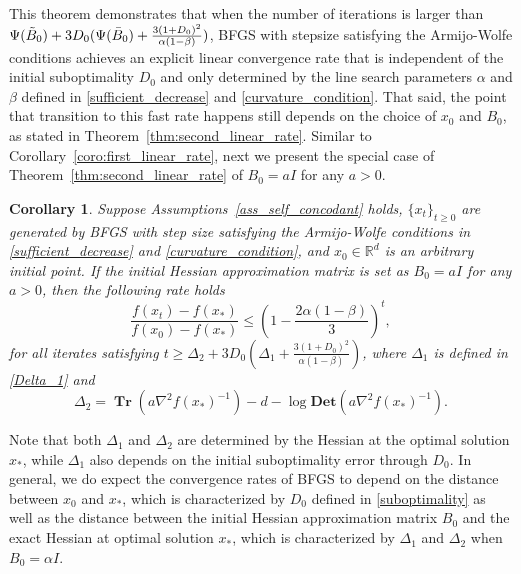 \documentclass[11pt,letterpaper]{article}
\newcommand{\Det}{\mathbf{Det}}
\newcommand\0{{\Vector{0}}}
\newcommand\1{{\Vector{1}}}
\DeclareMathOperator{\Tr}{\mathbf{Tr}}
\newtheorem{corollary}[theorem]{Corollary}
\numberwithin{assumption}{section}
\numberwithin{definition}{section}
\numberwithin{theorem}{section}
\numberwithin{remark}{section}
\begin{document}
This theorem demonstrates that when the number of iterations is larger than $\Psi(\Tilde{B}_{0}) + 3D_0(\Psi(\bar{B}_{0}) + \frac{3(1 + D_0)^2}{\alpha(1 - \beta)})$, BFGS with stepsize satisfying the Armijo-Wolfe conditions achieves an explicit linear convergence rate that is independent of the initial suboptimality $D_0$ and only determined by the line search parameters $\alpha$ and $\beta$ defined in \eqref{sufficient_decrease} and \eqref{curvature_condition}. That said, the point that transition to this fast rate happens still depends on the choice of $x_0$ and $B_0$, as stated in Theorem~\ref{thm:second_linear_rate}.
Similar to Corollary~\ref{coro:first_linear_rate}, next we present the special case of Theorem~\ref{thm:second_linear_rate} of $B_0 = a I$ for any $a > 0$.

\begin{corollary}\label{coro:second_linear_rate}
Suppose Assumptions~\ref{ass_self_concodant} holds, $\{x_t\}_{t\geq 0}$  are generated by BFGS with step size satisfying the Armijo-Wolfe conditions in \eqref{sufficient_decrease} and \eqref{curvature_condition}, and $x_0 \in \mathbb{R}^{d}$ is an arbitrary initial point. If the initial Hessian approximation matrix is set as $B_0 = a I$ for any $a > 0$, then the following rate holds
\begin{equation}\label{eq:second_linear_rate_a}
    \frac{f(x_t) - f(x_*)}{f(x_0) - f(x_*)} \leq \left(1 - \frac{2\alpha(1 - \beta)}{3} \right)^{t},
\end{equation}
for all iterates satisfying $
    t \geq \Delta_2 + 3D_0\left(\Delta_1 + \frac{3(1 + D_0)^2}{\alpha(1 - \beta)}\right)$,
where $\Delta_1$ is defined in \eqref{Delta_1} and 
\begin{equation}\label{Delta_2}
\Delta_2= \Tr(a\nabla^{2}{f(x_*)^{-1}}) - d - \log{\Det(a\nabla^{2}{f(x_*)^{-1}})}.
\end{equation}
\end{corollary}

Note that both $\Delta_1$ and $\Delta_2$ are determined by the Hessian at the optimal solution $x_*$, while $\Delta_1$ also depends on the initial suboptimality error through $D_0$. In general, we do expect the convergence rates of BFGS to depend on the distance between $x_0$ and $x_*$, which is characterized by $D_0$ defined in \eqref{suboptimality} as well as the distance between the initial Hessian approximation matrix $B_0$ and the exact Hessian at optimal solution $x_*$, which is characterized by $\Delta_1$ and $\Delta_2$ when $B_0 = \alpha I$.
\end{document}
